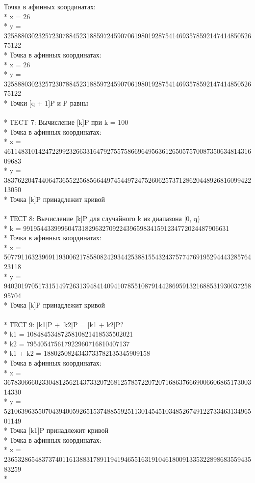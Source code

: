 \documentclass[12pt]{article}
\begin{document}
Точка в афинных координатах:\\*
x = 26\\*
y = 32588803023257230788452318859724590706198019287541469357859214741485052675122\\*
Точка в афинных координатах:\\*
x = 26\\*
y = 32588803023257230788452318859724590706198019287541469357859214741485052675122\\*
Точки [q + 1]P и P равны\\
\\*
ТECT 7: Вычисление [k]P при k = 100\\*
Точка в афинных координатах:\\*
x = 46114831014247229923266331647927557586696495636126505757008735063481431609683\\*
y = 38376220474406473655225685664497454497247526062573712862044892681609942213050\\*
Точка [k]P принадлежит кривой\\
\\*
ТЕСТ 8: Вычисление [k]P для случайного k из диапазона [0, q)\\*
k = 991954433999604731829632709224396598341591234772024487906631\\*
Точка в афинных координатах:\\*
x = 50779116323969119300621785808242934425388155432437577476919529444328576423118\\*
y = 94020197051731514972631394841409410785510879144286959132168853193003725895704\\*
Точка [k]P принадлежит кривой\\
\\*
ТЕСТ 9: [k1]P + [k2]P = [k1 + k2]P?\\*
k1 = 1084845348725810821418535502021\\*
k2 = 795405475617922960716810407137\\*
k1 + k2 = 1880250824343733782135345909158\\*
Точка в афинных координатах:\\*
x = 36783066602330481256214373320726812578572207207168637666900660686517300314330\\*
y = 52106396355070439400592651537488559251130145451034852674912273346313496501149\\*
Точка [k1]P принадлежит кривой\\*
Точка в афинных координатах:\\*
x = 23653286548373740116138831789119419465516319104618009133532289868355943583259\\*
\end{document}
